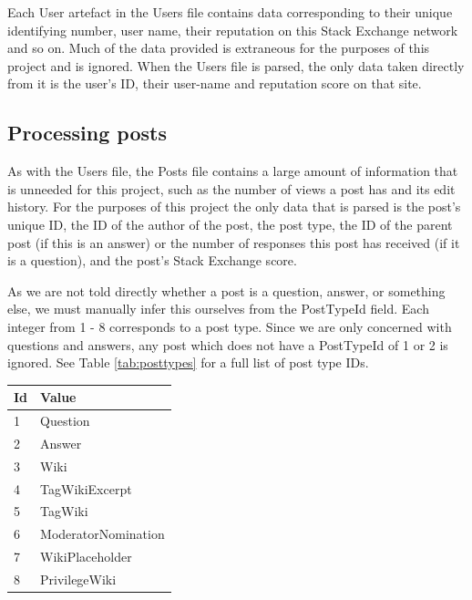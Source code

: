 \documentclass[]{final_report}
\begin{document}
Each User artefact in the Users file contains data corresponding to their unique identifying number, user name, their reputation on this Stack Exchange network and so on. Much of the data provided is extraneous for the purposes of this project and is ignored. When the Users file is parsed, the only data taken directly from it is the user's ID, their user-name and reputation score on that site.

\subsection{Processing posts}

As with the Users file, the Posts file contains a large amount of information that is unneeded for this project, such as the number of views a post has and its edit history. For the purposes of this project the only data that is parsed is the post's unique ID, the ID of the author of the post, the post type, the ID of the parent post (if this is an answer) or the number of responses this post has received (if it is a question), and the post's Stack Exchange score.

As we are not told directly whether a post is a question, answer, or something else, we must manually infer this ourselves from the PostTypeId field. Each integer from 1 - 8 corresponds to a post type. Since we are only concerned with questions and answers, any post which does not have a PostTypeId of 1 or 2 is ignored. See Table \ref{tab:posttypes} for a full list of post type IDs.

\begin{minipage}{\linewidth}
\centering
\begin{tabular}{|l|l|}
\hline \textbf{Id} & \textbf{Value} \\ 
\hline 1 & Question \\ 
\hline 2 & Answer \\ 
\hline 3 & Wiki \\ 
\hline 4 & TagWikiExcerpt \\ 
\hline 5 & TagWiki \\ 
\hline 6 & ModeratorNomination \\ 
\hline 7 & WikiPlaceholder \\ 
\hline 8 & PrivilegeWiki \\
\hline 
\end{tabular}\par
{} 
\label{tab:posttypes}
\end{minipage}
\end{document}
